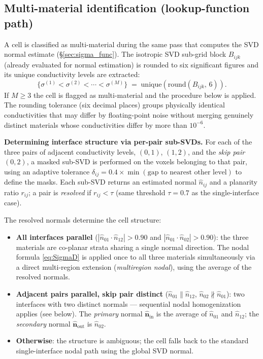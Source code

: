 \documentclass[11pt]{article}
\newcommand{\nn}{\hat{\bm{n}}}
\begin{document}
\subsection*{Multi-material identification (lookup-function path)}

A cell is classified as multi-material during the same pass that computes the
SVD normal estimate (\S\ref{sec:sigma_func}).  The isotropic SVD sub-grid block
$B_{ijk}$ (already evaluated for normal estimation) is rounded to six significant
figures and its unique conductivity levels are extracted:
\[
  \{\sigma^{(1)} < \sigma^{(2)} < \cdots < \sigma^{(M)}\}
  \;=\; \mathrm{unique}\!\left(\mathrm{round}(B_{ijk},\,6)\right).
\]
If $M \geq 3$ the cell is flagged as multi-material and the procedure below is
applied.  The rounding tolerance (six decimal places) groups physically identical
conductivities that may differ by floating-point noise without merging genuinely
distinct materials whose conductivities differ by more than $10^{-6}$.

\medskip
\noindent\textbf{Determining interface structure via per-pair sub-SVDs.}
For each of the three pairs of adjacent conductivity levels,
$(0,1)$, $(1,2)$, and the \emph{skip pair} $(0,2)$, a masked sub-SVD is
performed on the voxels belonging to that pair, using an adaptive tolerance
$\delta_{ij} = 0.4 \times \min(\text{gap to nearest other level})$ to define
the masks.  Each sub-SVD returns an estimated normal $\hat{n}_{ij}$ and a
planarity ratio $r_{ij}$; a pair is \emph{resolved} if $r_{ij} < \tau$
(same threshold $\tau = 0.7$ as the single-interface case).

The resolved normals determine the cell structure:
\begin{itemize}
\item \textbf{All interfaces parallel}
      ($|\hat{n}_{01}\cdot\hat{n}_{12}| > 0.90$ and
       $|\hat{n}_{01}\cdot\hat{n}_{02}| > 0.90$):
      the three materials are co-planar strata sharing a single normal
      direction.  The nodal formula \eqref{eq:SigmaD} is applied once to all
      three materials simultaneously via a direct multi-region extension
      (\emph{multiregion nodal}), using the average of the resolved normals.
\item \textbf{Adjacent pairs parallel, skip pair distinct}
      ($\hat{n}_{01} \parallel \hat{n}_{12}$, $\hat{n}_{02} \not\parallel \hat{n}_{01}$):
      two interfaces with two distinct normals — sequential nodal homogenization applies
      (see below).  The \emph{primary} normal $\nn_\mathrm{in}$ is the average
      of $\hat{n}_{01}$ and $\hat{n}_{12}$; the \emph{secondary} normal
      $\nn_\mathrm{out}$ is $\hat{n}_{02}$.
\item \textbf{Otherwise}: the structure is ambiguous; the cell falls back to
      the standard single-interface nodal path using the global SVD normal.
\end{itemize}
\end{document}
